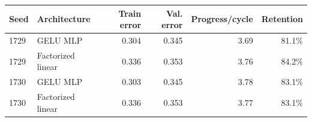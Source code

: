 \begin{tabular}{llrrrr}
\toprule
Seed & Architecture & Train error & Val. error & Progress/cycle & Retention \\
\midrule
1729 & GELU MLP & 0.304 & 0.345 & 3.69 & 81.1\% \\
1729 & Factorized linear & 0.336 & 0.353 & 3.76 & 84.2\% \\
1730 & GELU MLP & 0.303 & 0.345 & 3.78 & 83.1\% \\
1730 & Factorized linear & 0.336 & 0.353 & 3.77 & 83.1\% \\
\bottomrule
\end{tabular}
